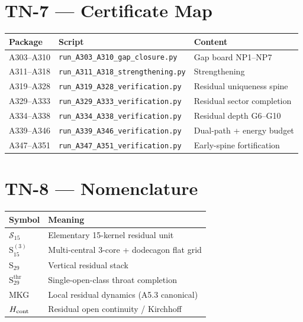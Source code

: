 \documentclass[11pt,a4paper]{article}
\begin{document}
\section{TN-7 --- Certificate Map}
\begin{center}
\begin{tabular}{@{}llp{5.5cm}@{}}
\toprule
Package & Script & Content \\
\midrule
A303--A310 & \texttt{run\_A303\_A310\_gap\_closure.py} & Gap board NP1--NP7 \\
A311--A318 & \texttt{run\_A311\_A318\_strengthening.py} & Strengthening \\
A319--A328 & \texttt{run\_A319\_A328\_verification.py} & Residual uniqueness spine \\
A329--A333 & \texttt{run\_A329\_A333\_verification.py} & Residual sector completion \\
A334--A338 & \texttt{run\_A334\_A338\_verification.py} & Residual depth G6--G10 \\
A339--A346 & \texttt{run\_A339\_A346\_verification.py} & Dual-path + energy budget \\
A347--A351 & \texttt{run\_A347\_A351\_verification.py} & Early-spine fortification \\
\bottomrule
\end{tabular}
\end{center}

\section{TN-8 --- Nomenclature}
\begin{center}
\begin{tabular}{@{}ll@{}}
\toprule
Symbol & Meaning \\
\midrule
$\mathcal{S}_{15}$ & Elementary 15-kernel residual unit \\
$\mathrm{S}_{15}^{(3)}$ & Multi-central 3-core + dodecagon flat grid \\
$\mathrm{S}_{29}$ & Vertical residual stack \\
$\mathrm{S}_{29}^{\mathrm{thr}}$ & Single-open-class throat completion \\
MKG & Local residual dynamics (A5.3 canonical) \\
$H_{\rm cont}$ & Residual open continuity / Kirchhoff \\
\bottomrule
\end{tabular}
\end{center}
\end{document}
